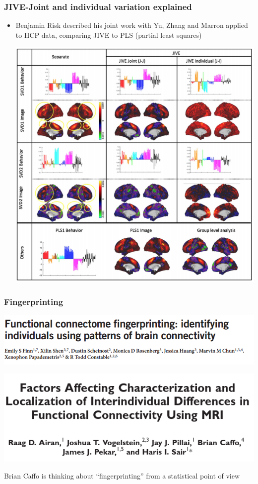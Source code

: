 \documentclass{beamer}
\begin{document}
\begin{frame}
\frametitle{JIVE-Joint and individual variation explained}
\begin{itemize}
\item Benjamin Risk described his joint work with Yu, Zhang and Marron applied to HCP data, comparing JIVE to PLS (partial least squares)
\begin{center}
\includegraphics[scale = 0.3]{jsm_figs/jive_brain.png}
\end{center}
\end{itemize}
\end{frame}

\begin{frame}
\frametitle{Fingerprinting}
\begin{center}
\includegraphics[scale = 0.3]{jsm_figs/finngerprinting.png}

\includegraphics[scale = 0.3]{jsm_figs/airan_factors.png}
\end{center}
Brian Caffo is thinking about ``fingerprinting'' from a statistical point of view
\end{frame}
\end{document}
